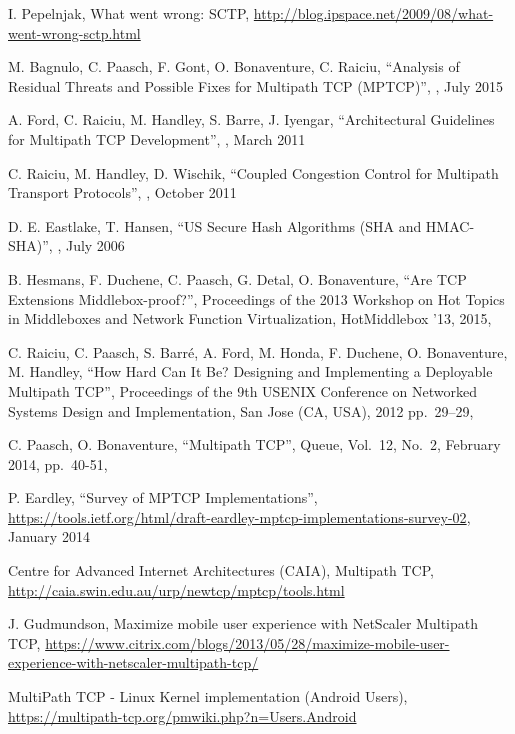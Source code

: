 \begin{thebibliography}{99}
I. Pepelnjak, What went wrong: SCTP,
\url{http://blog.ipspace.net/2009/08/what-went-wrong-sctp.html}

M. Bagnulo, C. Paasch, F. Gont, O. Bonaventure, C. Raiciu,
``Analysis of Residual Threats and Possible Fixes for Multipath TCP (MPTCP)'',
,  July 2015

A. Ford, C. Raiciu, M. Handley, S. Barre, J. Iyengar,
``Architectural Guidelines for Multipath TCP Development'',
,  March 2011

C. Raiciu, M. Handley, D. Wischik,
``Coupled Congestion Control for Multipath Transport Protocols'',
,  October 2011

D. E. Eastlake, T. Hansen,
``US Secure Hash Algorithms (SHA and HMAC-SHA)'',
,  July 2006

B. Hesmans, F. Duchene, C. Paasch, G. Detal, O. Bonaventure, 
``Are TCP Extensions Middlebox-proof?'',
Proceedings of the 2013 Workshop on Hot Topics in Middleboxes and Network Function Virtualization, 
HotMiddlebox '13,
2015,

C. Raiciu, C. Paasch, S. Barr{\'e}, A. Ford, M. Honda, F. Duchene, O. Bonaventure, M. Handley, 
``How Hard Can It Be? Designing and Implementing a Deployable Multipath TCP'',
Proceedings of the 9th USENIX Conference on Networked Systems Design and Implementation,
San Jose (CA, USA), 2012 
pp.\ 29--29, 

C. Paasch, O. Bonaventure, 
``Multipath TCP'', 
Queue, 
Vol.\ 12, No.\ 2, 
February 2014,
pp.\ 40-51,

P. Eardley,
``Survey of MPTCP Implementations'',
\url{https://tools.ietf.org/html/draft-eardley-mptcp-implementations-survey-02}, January 2014

Centre for Advanced Internet Architectures (CAIA), Multipath TCP,
\url{http://caia.swin.edu.au/urp/newtcp/mptcp/tools.html}

J. Gudmundson, Maximize mobile user experience with NetScaler Multipath TCP,
\url{https://www.citrix.com/blogs/2013/05/28/maximize-mobile-user-experience-with-netscaler-multipath-tcp/}

MultiPath TCP - Linux Kernel implementation (Android Users),
\url{https://multipath-tcp.org/pmwiki.php?n=Users.Android}


\end{thebibliography}

